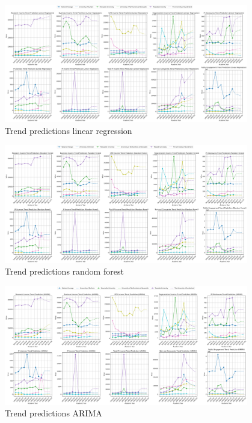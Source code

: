 \documentclass[journal,onecolumn, 10pt,draftclsnofoot]{IEEEtran}
\begin{document}
\begin{figure}[h]
\centering
\includegraphics[width=0.95\textwidth]{Fig/appendix2.trend_predictions_linear_regression.png}
\caption{Trend predictions linear regression}
\label{fig:trend-predictions-linear-regression}
\end{figure}

\begin{figure}[h]
\centering
\includegraphics[width=0.95\textwidth]{Fig/appendix3.trend_predictions_random_forest.png}
\caption{Trend predictions random forest}
\label{fig:trend-predictions-random-forest}
\end{figure}

\begin{figure}[h]
\centering
\includegraphics[width=0.95\textwidth]{Fig/appendix1.trend_predictions_arima.png}
\caption{Trend predictions ARIMA}
\label{fig:trend-predictions-arima}
\end{figure}
\end{document}
